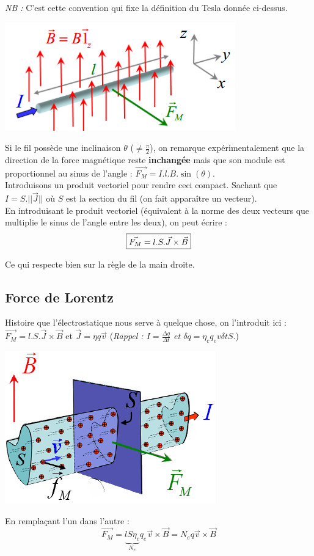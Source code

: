\documentclass	[11pt, a4paper, openany]{book}
\begin{document}
\textit{NB :} C'est cette convention qui fixe la définition du Tesla donnée ci-dessus.
\begin{center}
\includegraphics[scale=0.55]{magneto/image1.png}
\end{center}
Si le fil possède une inclinaison $\theta$ ($\neq \frac{\pi}{2}$), on remarque expérimentalement que la direction de la force magnétique reste \textbf{inchangée} mais que son module est proportionnel au sinus de l'angle : $\vec{F_M} = I.l.B.\sin(\theta)$.
\\

Introduisons un produit vectoriel pour rendre ceci compact. Sachant que $I = S.||\vec{J}||$ où $S$ est la section du fil (on fait apparaître un vecteur). \\
En introduisant le produit vectoriel (équivalent à la norme des deux vecteurs que multiplie le sinus de l'angle entre les deux), on peut écrire : 
\begin{equation}
\fbox{$\vec{F_M} = l.S.\vec{J} \times \vec{B} $}
\end{equation}

Ce qui respecte bien sur la règle de la main droite.

\subsection{Force de Lorentz}
Histoire que l'électrostatique nous serve à quelque chose, on l'introduit ici :
$\vec{F_M} =  l.S.\vec{J} \times \vec{B}$ et $\vec{J} =  \eta q \vec{v}$ (\textit{Rappel  : $I = \frac{\Delta q}{\Delta t}$ et $\delta q = \eta_c q_e v \delta t S$}.) 
\begin{center}
\includegraphics[scale=0.55]{magneto/image4.png}
\end{center}
En remplaçant l'un dans l'autre :
\begin{equation}
\vec{F_M} = \underbrace{lS\eta_c}_{N_e} q_e \vec{v} \times \vec{B} = N_eq \vec{v} \times \vec{B}
\end{equation}
\end{document}
